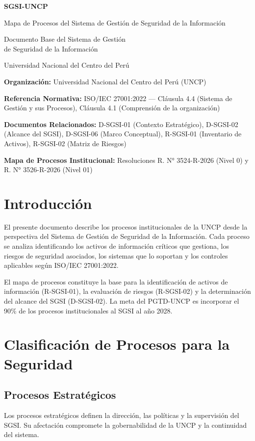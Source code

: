 \documentclass[10pt,letterpaper]{article}
\newcommand{\makecover}{
\begin{titlepage}
\centering
\vspace*{2cm}
{\Huge\bfseries\color{uncpblue} SGSI-UNCP\par}
\vspace{0.7cm}
{\LARGE Mapa de Procesos del Sistema de Gestión de Seguridad de la
Información\par}
\vspace{0.5cm}
{\large Documento Base del Sistema de Gestión\\de Seguridad de la Información\par}
\vspace{1.5cm}
{\small Universidad Nacional del Centro del Perú\par}
\vfill
\end{titlepage}
}
\begin{document}
\makecover
\setcounter{tocdepth}{2}
\RaggedRight
\tableofcontents
\newpage

\RaggedRight
\textbf{Organización:} Universidad Nacional del Centro del Perú (UNCP)

\textbf{Referencia Normativa:} ISO/IEC 27001:2022 --- Cláusula 4.4
(Sistema de Gestión y sus Procesos), Cláusula 4.1 (Comprensión de la
organización)

\textbf{Documentos Relacionados:} D-SGSI-01 (Contexto Estratégico),
D-SGSI-02 (Alcance del SGSI), D-SGSI-06 (Marco Conceptual), R-SGSI-01
(Inventario de Activos), R-SGSI-02 (Matriz de Riesgos)

\textbf{Mapa de Procesos Institucional:} Resoluciones R. N° 3524-R-2026
(Nivel 0) y R. N° 3526-R-2026 (Nivel 01)

\section{Introducción}\label{introducciuxf3n}

El presente documento describe los procesos institucionales de la UNCP
desde la perspectiva del Sistema de Gestión de Seguridad de la
Información. Cada proceso se analiza identificando los activos de
información críticos que gestiona, los riesgos de seguridad asociados,
los sistemas que lo soportan y los controles aplicables según ISO/IEC
27001:2022.

El mapa de procesos constituye la base para la identificación de activos
de información (R-SGSI-01), la evaluación de riesgos (R-SGSI-02) y la
determinación del alcance del SGSI (D-SGSI-02). La meta del PGTD-UNCP es
incorporar el 90\% de los procesos institucionales al SGSI al año 2028.

\section{Clasificación de Procesos para la
Seguridad}\label{clasificaciuxf3n-de-procesos-para-la-seguridad}

\subsection{Procesos Estratégicos}\label{procesos-estratuxe9gicos}

Los procesos estratégicos definen la dirección, las políticas y la
supervisión del SGSI. Su afectación compromete la gobernabilidad de la
UNCP y la continuidad del sistema.
\end{document}
